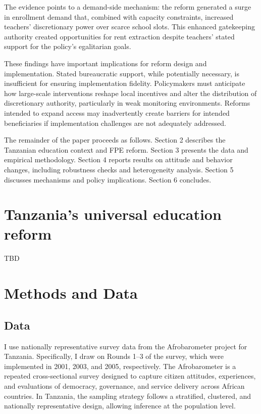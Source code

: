 \documentclass[hidelinks,12pt]{article}
\begin{document}
\begin{singlespace}
The evidence points to a demand-side mechanism: the reform generated a surge in enrollment demand that, combined with capacity constraints, increased teachers' discretionary power over scarce school slots. This enhanced gatekeeping authority created opportunities for rent extraction despite teachers' stated support for the policy's egalitarian goals.

These findings have important implications for reform design and implementation. Stated bureaucratic support, while potentially necessary, is insufficient for ensuring implementation fidelity. Policymakers must anticipate how large-scale interventions reshape local incentives and alter the distribution of discretionary authority, particularly in weak monitoring environments. Reforms intended to expand access may inadvertently create barriers for intended beneficiaries if implementation challenges are not adequately addressed.

The remainder of the paper proceeds as follows. Section 2 describes the Tanzanian education context and FPE reform. Section 3 presents the data and empirical methodology. Section 4 reports results on attitude and behavior changes, including robustness checks and heterogeneity analysis. Section 5 discusses mechanisms and policy implications. Section 6 concludes.

\section{Tanzania's universal education reform}
TBD

\section{Methods and Data}


\subsection{Data}
I use nationally representative survey data from the Afrobarometer project for Tanzania. Specifically, I draw on Rounds 1--3 of the survey, which were implemented in 2001, 2003, and 2005, respectively. The Afrobarometer is a repeated cross-sectional survey designed to capture citizen attitudes, experiences, and evaluations of democracy, governance, and service delivery across African countries. In Tanzania, the sampling strategy follows a stratified, clustered, and nationally representative design, allowing inference at the population level.  


\end{singlespace}
\end{document}
